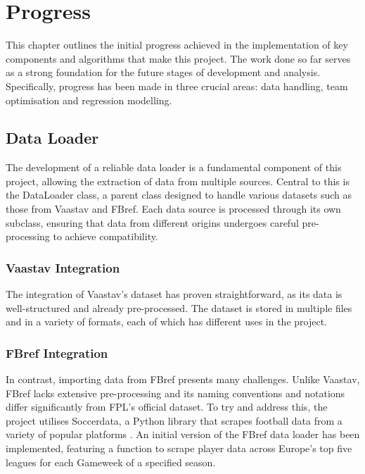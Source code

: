 \chapter{Progress}

This chapter outlines the initial progress achieved in the implementation of key components and algorithms that make this project. The work done so far serves as a strong foundation for the future stages of development and analysis. Specifically, progress has been made in three crucial areas: data handling, team optimisation and regression modelling.

\section{Data Loader}

The development of a reliable data loader is a fundamental component of this project, allowing the extraction of data from multiple sources. Central to this is the DataLoader class, a parent class designed to handle various datasets such as those from Vaastav and FBref. Each data source is processed through its own subclass, ensuring that data from different origins undergoes careful pre-processing to achieve compatibility.

\subsection{Vaastav Integration}

The integration of Vaastav’s dataset has proven straightforward, as its data is well-structured and already pre-processed. The dataset is stored in multiple files and in a variety of formats, each of which has different uses in the project.

\subsection{FBref Integration}

In contrast, importing data from FBref presents many challenges. Unlike Vaastav, FBref lacks extensive pre-processing and its naming conventions and notations differ significantly from FPL’s official dataset. To try and address this, the project utilises Soccerdata, a Python library that scrapes football data from a variety of popular platforms \cite{soccerdata}. An initial version of the FBref data loader has been implemented, featuring a function to scrape player data across Europe’s top five leagues for each Gameweek of a specified season.


